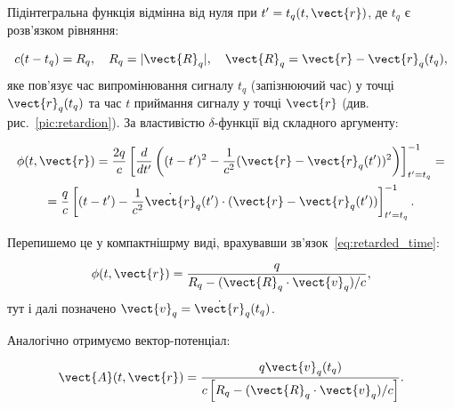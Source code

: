 Підінтегральна функція відмінна від нуля при \( t' = t_q (t, \vect{r}) \), де \( t_q \) є розв'язком рівняння:

\begin{equation}\label{eq:retarded_time}
	c(t - t_q) = R_q, \quad R_q = |\vect{R}_q|, \quad \vect{R}_q = \vect{r} - \vect{r}_q (t_q),
\end{equation}
%
яке пов'язує час випромінювання сигналу \( t_q \) (запізнюючий час) у точці \( \vect{r}_q (t_q) \) та час \( t \)
приймання сигналу у точці \( \vect{r} \) (див. рис.~\ref{pic:retardion}). За властивістю \(\delta\)-функції від
складного аргументу:

\begin{multline}\label{eq:potential-1}
	\phi(t, \vect{r}) = \frac{2q}{c} \left[ \frac{d}{dt'} \left( (t - t')^2 - \frac{1}{c^2} (\vect{r} - \vect{r}_q (t'))^2 \right) \right]_{t' =
	t_q}^{-1} = \\
    = \frac{q}{c} \left[  (t - t') - \frac{1}{c^2} \dot{\vect{r}}_q (t') \cdot (\vect{r} - \vect{r}_q (t')) \right]_{t' = t_q}^{-1}.
\end{multline}

Перепишемо це у компактнішрму виді, врахувавши зв'язок~\eqref{eq:retarded_time}:

\begin{equation}
	\phi(t, \vect{r}) = \frac{q}{R_q - (\vect{R}_q \cdot \vect{v}_q)/c},
	\label{eq:compact_potential}
\end{equation}
тут і далі позначено \( \vect{v}_q = \dot{\vect{r}}_q (t_q) \).

Аналогічно отримуємо вектор-потенціал:

\begin{equation}
	\vect{A}(t, \vect{r}) = \frac{q \vect{v}_q (t_q)}{c \left[ R_q - (\vect{R}_q \cdot \vect{v}_q)/c \right]}.
	\label{eq:vector_potential}
\end{equation}

